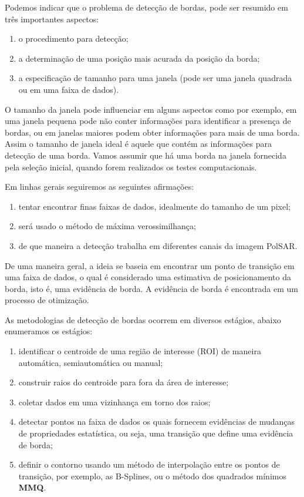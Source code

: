 Podemos indicar que o problema de detecção de bordas, pode ser resumido em três importantes aspectos:
\begin{enumerate}
	\item o procedimento para detecção;
	\item a determinação de uma posição mais acurada da posição da borda;
	\item a especificação de tamanho para uma janela (pode ser uma janela quadrada ou em uma faixa de dados). 
\end{enumerate}

O tamanho da janela pode influenciar em alguns aspectos como por exemplo, em uma janela pequena pode não conter informações para identificar a presença de bordas, ou em janelas maiores podem obter informações para mais de uma borda. Assim o tamanho de janela ideal é aquele que contém as informações para detecção de uma borda. Vamos assumir que há uma borda na janela fornecida pela seleção inicial, quando forem realizados os testes computacionais.

Em linhas gerais seguiremos as seguintes afirmações: 
\begin{enumerate}
	\item tentar encontrar finas faixas de dados, idealmente do tamanho de um pixel;
	\item será usado o método de máxima verossimilhança;
	\item de que maneira a detecção trabalha em diferentes canais da imagem PolSAR. 
\end{enumerate}

De uma maneira geral, a ideia se baseia em encontrar um ponto de transição em uma faixa de dados, o qual é considerado uma estimativa de posicionamento da borda, isto é, uma evidência de borda. A evidência de borda é encontrada em um processo de otimização. 

As metodologias de detecção de bordas ocorrem em diversos estágios, abaixo enumeramos os estágios:
\begin{enumerate}
	\item identificar o centroide de uma região de interesse (ROI) de maneira automática, semiautomática ou manual;
	\item construir raios do centroide para fora da área de interesse;
	\item coletar dados em uma vizinhança em torno dos raios;
	\item detectar pontos na faixa de dados os quais fornecem evidências de mudanças de propriedades estatística, ou seja, uma transição que define uma evidência de borda;
	\item definir o contorno usando um método de interpolação entre os pontos de transição, por exemplo, as B-Splines, ou o método dos quadrados mínimos \textbf{MMQ}.
\end{enumerate}

